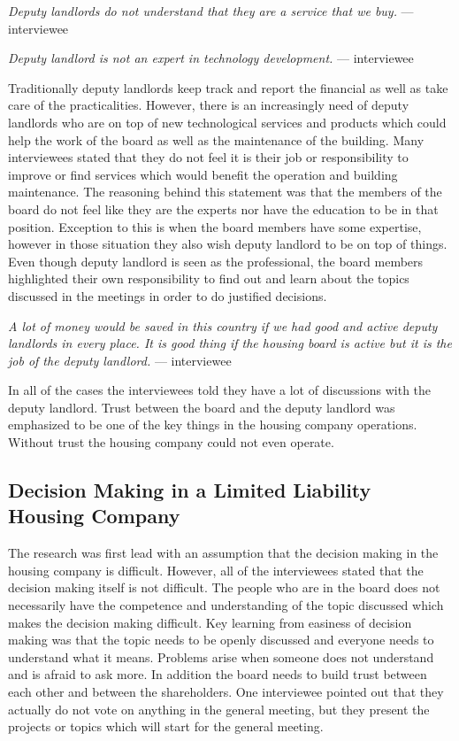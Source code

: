 \begin{displayquote}
\textit{Deputy landlords do not understand that they are a service that we buy.} --- interviewee
\end{displayquote}

\begin{displayquote}
\textit{Deputy landlord is not an expert in technology development.} --- interviewee
\end{displayquote}

Traditionally deputy landlords keep track and report the financial as well as take care of the practicalities. However, there is an increasingly need of deputy landlords who are on top of new technological services and products which could help the work of the board as well as the maintenance of the building. Many interviewees stated that they do not feel it is their job or responsibility to improve or find services which would benefit the operation and building maintenance. The reasoning behind this statement was that the members of the board do not feel like they are the experts nor have the education to be in that position. Exception to this is when the board members have some expertise, however in those situation they also wish deputy landlord to be on top of things. Even though deputy landlord is seen as the professional, the board members highlighted their own responsibility to find out and learn about the topics discussed in the meetings in order to do justified decisions.

\begin{displayquote}
\textit{A lot of money would be saved in this country if we had good
and active deputy landlords in every place. It is good thing if the
housing board is active but it is the job of the deputy landlord.} --- interviewee
\end{displayquote}

In all of the cases the interviewees told they have a lot of discussions with the deputy landlord. Trust between the board and the deputy landlord was emphasized to be one of the key things in the housing company operations. Without trust the housing company could not even operate.

\subsection{Decision Making in a Limited Liability Housing Company}

The research was first lead with an assumption that the decision making in the housing company is difficult. However, all of the interviewees stated that the decision making itself is not difficult. The people who are in the board does not necessarily have the competence and understanding of the topic discussed which makes the decision making difficult. Key learning from easiness of decision making was that the topic needs to be openly discussed and everyone needs to understand what it means. Problems arise when someone does not understand and is afraid to ask more. In addition the board needs to build trust between each other and between the shareholders. One interviewee pointed out that they actually do not vote on anything in the general meeting, but they present the projects or topics which will start for the general meeting.

